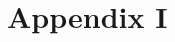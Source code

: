 \clearpage 






\clearpage
\section{Appendix I}
\setcounter{table}{0}
\renewcommand{\thetable}{A\arabic{table}}